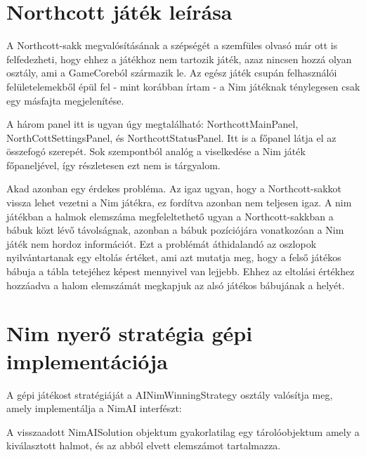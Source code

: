 \section{Northcott játék leírása}
A Northcott-sakk megvalósításának a szépségét a szemfüles olvasó már ott is felfedezheti, hogy ehhez a játékhoz nem tartozik játék, azaz nincsen hozzá olyan osztály, ami a GameCoreból származik le. Az egész játék csupán felhasználói felületelemekből épül fel - mint korábban írtam - a Nim játéknak ténylegesen csak egy másfajta megjelenítése.\ujsor

A három panel itt is ugyan úgy megtalálható: NorthcottMainPanel, NorthCottSettingsPanel, és NorthcottStatusPanel. Itt is a főpanel látja el az összefogó szerepét. Sok szempontból analóg a viselkedése a Nim játék főpaneljével, így részletesen ezt nem is tárgyalom.\ujsor

Akad azonban egy érdekes probléma. Az igaz ugyan, hogy a Northcott-sakkot vissza lehet vezetni a Nim játékra, ez fordítva azonban nem teljesen igaz. A nim játékban a halmok elemszáma megfeleltethető ugyan a Northcott-sakkban a bábuk közt lévő távolságnak, azonban a bábuk pozíciójára vonatkozóan a Nim játék nem hordoz információt. Ezt a problémát áthidalandó az oszlopok nyilvántartanak egy eltolás értéket, ami azt mutatja meg, hogy a felső játékos bábuja a tábla tetejéhez képest mennyivel van lejjebb. Ehhez az eltolási értékhez hozzáadva a halom elemszámát megkapjuk az alsó játékos bábujának a helyét.

\section{Nim nyerő stratégia gépi implementációja} \label{section:nim_impl_winning_strategy}
A gépi játékost stratégiáját a AINimWinningStrategy osztály valósítja meg, amely implementálja a NimAI interfészt:


A visszaadott NimAISolution objektum gyakorlatilag egy tárolóobjektum amely a kiválasztott halmot, és az abból elvett elemszámot tartalmazza.

